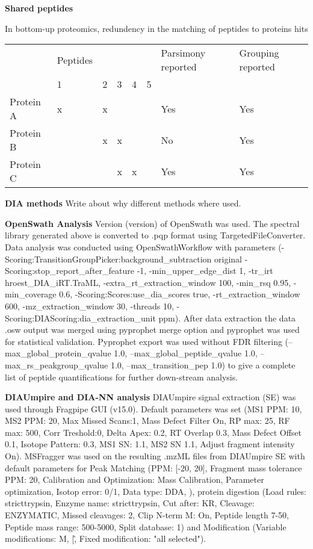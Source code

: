 \documentclass[10pt,letterpaper]{article}
\begin{document}
\textbf{Shared peptides}

In bottom-up proteomics, redundency in the matching of peptides to proteins hits \cite{nesvizhskii2005interpretation}

\begin{table}[]
\begin{tabular}{llllllll}
          & Peptides &   &   &   &   & Parsimony reported & Grouping reported \\
          & 1        & 2 & 3 & 4 & 5 &                    &                   \\
Protein A & x        & x &   &   &   & Yes                & Yes               \\
Protein B &          & x & x &   &   & No                 & Yes               \\
Protein C &          &   & x & x &   & Yes                & Yes              
\end{tabular}
\end{table}

\textbf{DIA methods}
Write about why different methods where used.

\textbf{OpenSwath Analysis}
Version (version) of OpenSwath was used. The spectral library generated above is converted to .pqp format using TargetedFileConverter. Data analysis was conducted using OpenSwathWorkflow with parameters (-Scoring:TransitionGroupPicker:background\_subtraction original -Scoring:stop\_report\_after\_feature -1, -min\_upper\_edge\_dist 1, -tr\_irt hroest\_DIA\_iRT.TraML, -extra\_rt\_extraction\_window 100, -min\_rsq 0.95, -min\_coverage 0.6, -Scoring:Scores:use\_dia\_scores true, -rt\_extraction\_window 600, -mz\_extraction\_window 30, -threads 10, -Scoring:DIAScoring:dia\_extraction\_unit ppm). After data extraction the data .osw output was merged using pyprophet merge option and pyprophet was used for statistical validation. Pyprophet export was used without FDR filtering (--max\_global\_protein\_qvalue 1.0, --max\_global\_peptide\_qvalue 1.0, --max\_rs\_peakgroup\_qvalue 1.0, --max\_transition\_pep 1.0) to give a complete list of peptide quantifications for further down-stream analysis.

\textbf{DIAUmpire and DIA-NN analysis}
DIAUmpire signal extraction (SE) was used through Fragpipe GUI (v15.0). Default parameters was set (MS1 PPM: 10, MS2 PPM: 20, Max Missed Scans:1, Mass Defect Filter On, RP max: 25, RF max: 500, Corr Treshold:0, Delta Apex: 0.2, RT Overlap 0.3, Mass Defect Offset 0.1, Isotope Pattern: 0.3, MS1 SN: 1.1, MS2 SN 1.1, Adjust fragment intensity On). MSFragger was used on the resulting .mzML files from DIAUmpire SE with default parameters for Peak Matching (PPM: [-20, 20], Fragment mass tolerance PPM: 20, Calibration and Optimization: Mass Calibration, Parameter optimization, Isotop error: 0/1, Data type: DDA, ), protein digestion (Load rules: stricttrypsin, Enzyme name: stricttrypsin, Cut after: KR, Cleavage: ENZYMATIC, Missed cleavages: 2, Clip N-term M: On, Peptide length 7-50, Peptide mass range: 500-5000, Split database: 1) and Modification (Variable modifications: M, \/[\^, Fixed modification: "all selected"). 
\end{document}
